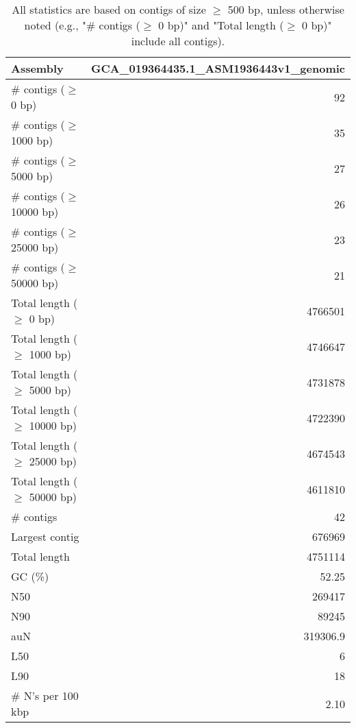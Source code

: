 \documentclass[12pt,a4paper]{article}
\begin{document}
\begin{table}[ht]
\begin{center}
\caption{All statistics are based on contigs of size $\geq$ 500 bp, unless otherwise noted (e.g., "\# contigs ($\geq$ 0 bp)" and "Total length ($\geq$ 0 bp)" include all contigs).}
\begin{tabular}{|l*{1}{|r}|}
\hline
Assembly & GCA\_019364435.1\_ASM1936443v1\_genomic \\ \hline
\# contigs ($\geq$ 0 bp) & 92 \\ \hline
\# contigs ($\geq$ 1000 bp) & 35 \\ \hline
\# contigs ($\geq$ 5000 bp) & 27 \\ \hline
\# contigs ($\geq$ 10000 bp) & 26 \\ \hline
\# contigs ($\geq$ 25000 bp) & 23 \\ \hline
\# contigs ($\geq$ 50000 bp) & 21 \\ \hline
Total length ($\geq$ 0 bp) & 4766501 \\ \hline
Total length ($\geq$ 1000 bp) & 4746647 \\ \hline
Total length ($\geq$ 5000 bp) & 4731878 \\ \hline
Total length ($\geq$ 10000 bp) & 4722390 \\ \hline
Total length ($\geq$ 25000 bp) & 4674543 \\ \hline
Total length ($\geq$ 50000 bp) & 4611810 \\ \hline
\# contigs & 42 \\ \hline
Largest contig & 676969 \\ \hline
Total length & 4751114 \\ \hline
GC (\%) & 52.25 \\ \hline
N50 & 269417 \\ \hline
N90 & 89245 \\ \hline
auN & 319306.9 \\ \hline
L50 & 6 \\ \hline
L90 & 18 \\ \hline
\# N's per 100 kbp & 2.10 \\ \hline
\end{tabular}
\end{center}
\end{table}
\end{document}
